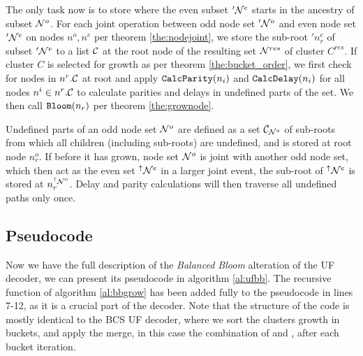 The only task now is to store where the even subset $'\mathcal{N}^e$ starts in the ancestry of subset $\mathcal{N}^o$.  For each joint operation between odd node set $'\mathcal{N}^o$ and even node set $'\mathcal{N}^e$ on nodes $n^o, n^e$ per theorem \ref{the:nodejoint}, we store the sub-root $'n^e_r$ of subset $'\mathcal{N}^e$ to a list $\mathcal{C}$ at the root node of the resulting set $\mathcal{N}^{res}$ of cluster $C^{res}$. If cluster $C$ is selected for growth as per theorem \ref{the:bucket_order}, we first check for nodes in ${n^r}.\mathcal{C}$ at root and apply $\texttt{CalcParity}(n_i)$ and $\texttt{CalcDelay}(n_i)$ for all nodes $n^i \in {n^r}.\mathcal{C}$ to calculate parities and delays in undefined parts of the set. We then call $\texttt{Bloom}(n_r)$ per theorem \ref{the:grownode}.

\begin{theorem}\label{the:delayonce}
  Undefined parts of an odd node set $\mathcal{N}^o$ are defined as a set $\mathcal{C}_{\mathcal{N}^o}$ of sub-roots from which all children (including sub-roots) are undefined, and is stored at root node $n^o_r$. If before it has grown, node set $\mathcal{N}^o$ is joint with another odd node set, which then act as the even set ${}^{\uparrow}\mathcal{N}^e$ in a larger joint event, the sub-root of ${}^{\uparrow}\mathcal{N}^e$ is stored at $n^{{}^{\uparrow}\mathcal{N}^o}_r$. Delay and parity calculations will then traverse all undefined paths only once.
\end{theorem}

\subsection{Pseudocode}

Now we have the full description of the \emph{Balanced Bloom} alteration of the UF decoder, we can present its pseudocode in algorithm \ref{al:ufbb}. The recursive  function of algorithm \ref{al:bbgrow} has been added fully to the pseudocode in lines 7-12, as it is a crucial part of the decoder. Note that the structure of the code is mostly identical to the BCS UF decoder, where we sort the clusters growth in buckets, and apply the merge, in this case the combination of  and , after each bucket iteration.

